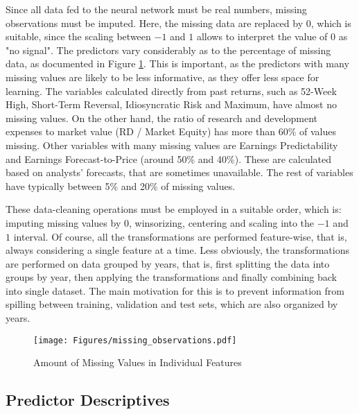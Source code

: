 		Since all data fed to the neural network must be real numbers, missing observations must be imputed. Here, the missing data are replaced by 0, which is suitable, since the scaling between $-1$ and $1$ allows to interpret the value of $0$ as "no signal". The predictors vary considerably as to the percentage of missing data, as documented in Figure \ref{fig:missing_observations}. This is important, as the predictors with many missing values are likely to be less informative, as they offer less space for learning. The variables calculated directly from past returns, such as 52-Week High, Short-Term Reversal, Idiosyncratic Risk and Maximum, have almost no missing values. On the other hand, the ratio of research and development expenses to market value (RD / Market Equity) has more than 60\% of values missing. Other variables with many missing values are Earnings Predictability and Earnings Forecast-to-Price (around 50\% and 40\%). These are calculated based on analysts' forecasts, that are sometimes unavailable. The rest of variables have typically between 5\% and 20\% of missing values.  
		
		These data-cleaning operations must be employed in a suitable order, which is: imputing missing values by $0$, winsorizing, centering and scaling into the $-1$ and $1$ interval. Of course, all the transformations are performed feature-wise, that is, always considering a single feature at a time. Less obviously, the transformations are performed on data grouped by years, that is, first splitting the data into groups by year, then applying the transformations and finally combining back into single dataset. The main motivation for this is to prevent information from spilling between training, validation and test sets, which are also organized by years.  
		
		\begin{center}
			\begin{figure}
				\texttt{[image: Figures/missing\_observations.pdf]}
				\caption{Amount of Missing Values in Individual Features}
				\label{fig:missing_observations}
			\end{figure}
		\end{center}
		
	
	
	\subsection{Predictor Descriptives}   	
	

